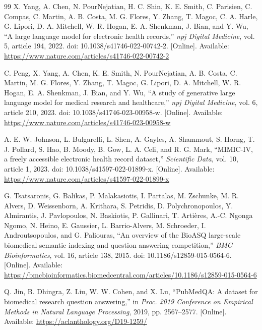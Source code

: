 \begin{thebibliography}{99}
X. Yang, A. Chen, N. PourNejatian, H. C. Shin, K. E. Smith, C. Parisien, C. Compas, C. Martin, A. B. Costa, M. G. Flores, Y. Zhang, T. Magoc, C. A. Harle, G. Lipori, D. A. Mitchell, W. R. Hogan, E. A. Shenkman, J. Bian, and Y. Wu,
``A large language model for electronic health records,''
\textit{npj Digital Medicine}, vol. 5, article 194, 2022.
doi: 10.1038/s41746-022-00742-2.
[Online]. Available: \url{https://www.nature.com/articles/s41746-022-00742-2}

C. Peng, X. Yang, A. Chen, K. E. Smith, N. PourNejatian, A. B. Costa, C. Martin, M. G. Flores, Y. Zhang, T. Magoc, G. Lipori, D. A. Mitchell, W. R. Hogan, E. A. Shenkman, J. Bian, and Y. Wu,
``A study of generative large language model for medical research and healthcare,''
\textit{npj Digital Medicine}, vol. 6, article 210, 2023.
doi: 10.1038/s41746-023-00958-w.
[Online]. Available: \url{https://www.nature.com/articles/s41746-023-00958-w}

A. E. W. Johnson, L. Bulgarelli, L. Shen, A. Gayles, A. Shammout, S. Horng, T. J. Pollard, S. Hao, B. Moody, B. Gow, L. A. Celi, and R. G. Mark,
``MIMIC-IV, a freely accessible electronic health record dataset,''
\textit{Scientific Data}, vol. 10, article 1, 2023.
doi: 10.1038/s41597-022-01899-x.
[Online]. Available: \url{https://www.nature.com/articles/s41597-022-01899-x}



G. Tsatsaronis, G. Balikas, P. Malakasiotis, I. Partalas, M. Zschunke, M. R. Alvers, D. Weissenborn, A. Krithara, S. Petridis, D. Polychronopoulos, Y. Almirantis, J. Pavlopoulos, N. Baskiotis, P. Gallinari, T. Arti{\`e}res, A.-C. Ngonga Ngomo, N. Heino, E. Gaussier, L. Barrio-Alvers, M. Schroeder, I. Androutsopoulos, and G. Paliouras,
``An overview of the BioASQ large-scale biomedical semantic indexing and question answering competition,''
\textit{BMC Bioinformatics}, vol. 16, article 138, 2015.
doi: 10.1186/s12859-015-0564-6.
[Online]. Available: \url{https://bmcbioinformatics.biomedcentral.com/articles/10.1186/s12859-015-0564-6}

Q. Jin, B. Dhingra, Z. Liu, W. W. Cohen, and X. Lu,
``PubMedQA: A dataset for biomedical research question answering,''
in \textit{Proc. 2019 Conference on Empirical Methods in Natural Language Processing}, 2019, pp. 2567--2577.
[Online]. Available: \url{https://aclanthology.org/D19-1259/}


\end{thebibliography}
